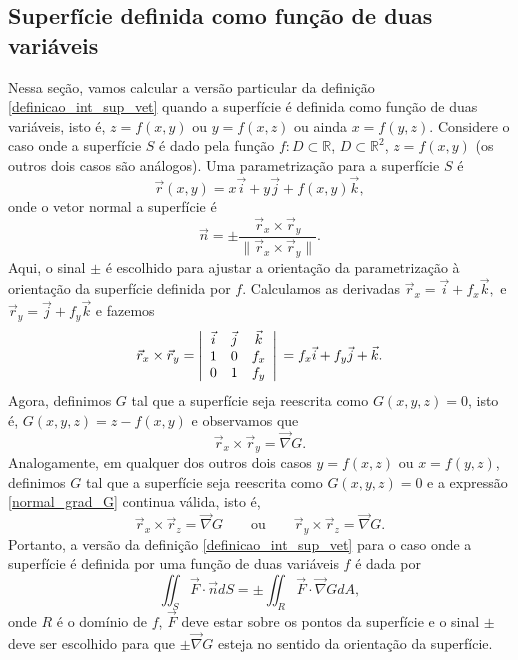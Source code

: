 \subsection{Superfície definida como função de duas variáveis}
Nessa seção, vamos calcular a versão particular da definição \eqref{definicao_int_sup_vet} quando a superfície é definida como função de duas variáveis, isto é, $z=f(x,y)$ ou $y=f(x,z)$ ou ainda $x=f(y,z)$. Considere o caso onde a superfície $S$ é dado pela função $f:D\subset\mathbb{R}$, $D\subset \mathbb{R}^2$, $z=f(x,y)$ (os outros dois casos são análogos). Uma parametrização para a superfície $S$ é
$$
\vec{r}(x,y)= x\vec{i}+ y\vec{j}+ f(x,y)\vec{k},
$$
onde o vetor normal a superfície é
$$
\vec{n}=\pm\frac{\vec{r}_x\times \vec{r}_y}{\|\vec{r}_x\times \vec{r}_y\|}.
$$
Aqui, o sinal $\pm$ é escolhido para ajustar a orientação da parametrização à orientação da superfície definida por $f$. Calculamos as derivadas $\vec{r}_x=\vec{i}+ f_x\vec{k},$ e $\vec{r}_y=\vec{j}+ f_y\vec{k}$ e fazemos
$$
  \vec{r}_x\times\vec{r}_y=\left|
 \begin{array}{ccc}
 \vec{i} & \vec{j} & \vec{k} \\
  1 &0 & f_x \\
0 &  1 & f_y
 \end{array}
\right|\\= f_x\vec{i}+ f_y\vec{j}+\vec{k}.
$$
Agora, definimos $G$ tal que a superfície seja reescrita como $G(x,y,z)=0$, isto é, $G(x,y,z)=z-f(x,y)$ e observamos que
\begin{equation}\label{normal_grad_G}
   \vec{r}_x\times\vec{r}_y=\vec{ \nabla} G.
\end{equation}
Analogamente, em qualquer dos outros dois casos $y=f(x,z)$ ou $x=f(y,z)$, definimos $G$ tal que a superfície seja reescrita como $G(x,y,z)=0$ e a expressão \eqref{normal_grad_G} continua válida, isto é,
\begin{equation*}\label{normal_grad_G_2}
   \vec{r}_x\times\vec{r}_z=\vec{ \nabla} G\qquad \text{ou} \qquad    \vec{r}_y\times\vec{r}_z=\vec{ \nabla} G.
\end{equation*}
Portanto, a versão da definição \eqref{definicao_int_sup_vet} para o caso onde a superfície é definida por uma função de duas variáveis $f$ é dada por
\begin{equation}\label{definicao_int_sup_vet_par}
\iint_S \vec{F}\cdot \vec{n} d S= \pm \iint_R \vec{F}\cdot \vec{\nabla}G dA,
\end{equation}
onde $R$ é o domínio de $f$, $\vec{F}$ deve estar sobre os pontos da superfície e o sinal $\pm$ deve ser escolhido para que $\pm \vec{\nabla}G$ esteja no sentido da orientação da superfície.

